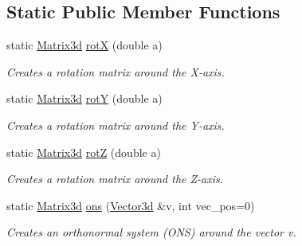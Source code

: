 \subsection*{Static Public Member Functions}
\begin{DoxyCompactItemize}
\item 
\mbox{\label{classCPlantBox_1_1Matrix3d_a8895aef9fc0ba32151a046247f10766f}} 
static \hyperlink{classCPlantBox_1_1Matrix3d}{Matrix3d} \hyperlink{classCPlantBox_1_1Matrix3d_a8895aef9fc0ba32151a046247f10766f}{rotX} (double a)
\begin{DoxyCompactList}\small\item\em Creates a rotation matrix around the X-\/axis. \end{DoxyCompactList}\item 
\mbox{\label{classCPlantBox_1_1Matrix3d_abaf49f5d175678190505ad23e74e53e7}} 
static \hyperlink{classCPlantBox_1_1Matrix3d}{Matrix3d} \hyperlink{classCPlantBox_1_1Matrix3d_abaf49f5d175678190505ad23e74e53e7}{rotY} (double a)
\begin{DoxyCompactList}\small\item\em Creates a rotation matrix around the Y-\/axis. \end{DoxyCompactList}\item 
\mbox{\label{classCPlantBox_1_1Matrix3d_aed1b8c6635dde507caf90d01eb5e02d4}} 
static \hyperlink{classCPlantBox_1_1Matrix3d}{Matrix3d} \hyperlink{classCPlantBox_1_1Matrix3d_aed1b8c6635dde507caf90d01eb5e02d4}{rotZ} (double a)
\begin{DoxyCompactList}\small\item\em Creates a rotation matrix around the Z-\/axis. \end{DoxyCompactList}\item 
static \hyperlink{classCPlantBox_1_1Matrix3d}{Matrix3d} \hyperlink{classCPlantBox_1_1Matrix3d_a65224dd4969719c7fc8072c6a913f4c8}{ons} (\hyperlink{classCPlantBox_1_1Vector3d}{Vector3d} \&v, int vec\+\_\+pos=0)
\begin{DoxyCompactList}\small\item\em Creates an orthonormal system (O\+NS) around the vector v. \end{DoxyCompactList}\end{DoxyCompactItemize}

